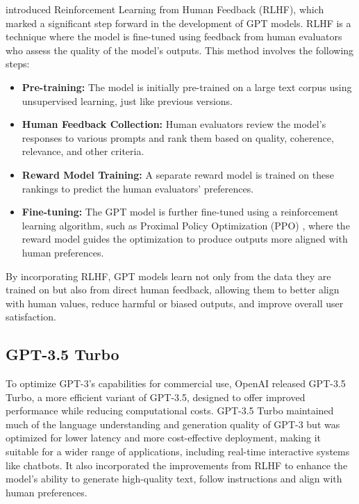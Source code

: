 \documentclass[a4paper,12pt,twoside]{ThesisStyle}
\begin{document}
\cite{Ouyang2022RLHF} introduced Reinforcement Learning from Human Feedback (RLHF), which marked a significant step forward in the development of GPT models. RLHF is a technique where the model is fine-tuned using feedback from human evaluators who assess the quality of the model's outputs. This method involves the following steps:


\begin{itemize}
  \item \textbf{Pre-training:} The model is initially pre-trained on a large text corpus using unsupervised learning, just like previous versions.
  \item \textbf{Human Feedback Collection:} Human evaluators review the model's responses to various prompts and rank them based on quality, coherence, relevance, and other criteria.
  \item \textbf{Reward Model Training:} A separate reward model is trained on these rankings to predict the human evaluators' preferences.
  \item \textbf{Fine-tuning:} The GPT model is further fine-tuned using a reinforcement learning algorithm, such as Proximal Policy Optimization (PPO) \cite{Schulman2017ProximalPolicyOptimizationAlgorithms}, where the reward model guides the optimization to produce outputs more aligned with human preferences.
\end{itemize}

By incorporating RLHF, GPT models learn not only from the data they are trained on but also from direct human feedback, allowing them to better align with human values, reduce harmful or biased outputs, and improve overall user satisfaction.

\subsection{GPT-3.5 Turbo}
\label{subsec:gpt-3.5-turbo}

To optimize GPT-3's capabilities for commercial use, OpenAI released GPT-3.5 Turbo, a more efficient variant of GPT-3.5, designed to offer improved performance while reducing computational costs. GPT-3.5 Turbo maintained much of the language understanding and generation quality of GPT-3 but was optimized for lower latency and more cost-effective deployment, making it suitable for a wider range of applications, including real-time interactive systems like chatbots. It also incorporated the improvements from RLHF to enhance the model's ability to generate high-quality text, follow instructions and align with human preferences.
\end{document}
